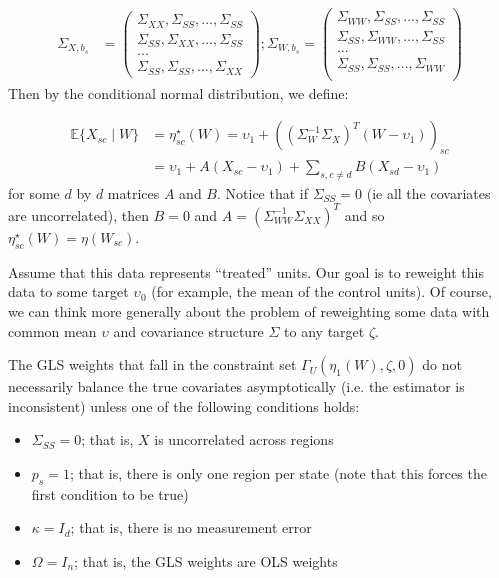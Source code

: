 \begin{align*}
\Sigma_{X, b_s} &= \begin{pmatrix}
\Sigma_{XX}, \Sigma_{SS}, ..., \Sigma_{SS} \\
\Sigma_{SS}, \Sigma_{XX}, ..., \Sigma_{SS} \\
... \\
\Sigma_{SS}, \Sigma_{SS}, ..., \Sigma_{XX}
\end{pmatrix};
\Sigma_{W, b_s} = \begin{pmatrix}
\Sigma_{WW}, \Sigma_{SS}, ..., \Sigma_{SS} \\
\Sigma_{SS}, \Sigma_{WW}, ..., \Sigma_{SS} \\
... \\
\Sigma_{SS}, \Sigma_{SS}, ..., \Sigma_{WW} \\
\end{pmatrix}
\end{align*}
%
Then by the conditional normal distribution, we define:

\begin{align*}
    \mathbb{E}\{X_{sc} \mid W\} &= \eta_{sc}^\star(W) = \upsilon_1 + ((\Sigma_W^{-1}\Sigma_X)^T(W - \upsilon_1))_{sc} \\
    &= \upsilon_1 + A(X_{sc} - \upsilon_1) + \sum_{s, c\ne d}B(X_{sd} - \upsilon_1)
\end{align*}
%
for some $d$ by $d$ matrices $A$ and $B$. Notice that if $\Sigma_{SS} = 0$ (ie all the covariates are uncorrelated), then $B = 0$ and $A = (\Sigma_{WW}^{-1}\Sigma_{XX})^T$ and so $\eta^\star_{sc}(W) = \eta(W_{sc})$.

Assume that this data represents ``treated'' units. Our goal is to reweight this data to some target $\upsilon_0$ (for example, the mean of the control units). Of course, we can think more generally about the problem of reweighting some data with common mean $\upsilon$ and covariance structure $\Sigma$ to any target $\zeta$.

\begin{proposition}
    The GLS weights that fall in the constraint set $\Gamma_U(\eta_1(W), \zeta, 0)$ do not necessarily balance the true covariates asymptotically (i.e. the estimator is inconsistent) unless one of the following conditions holds:
    \begin{itemize}
    \item $\Sigma_{SS} = 0$; that is, $X$ is uncorrelated across regions
    \item $p_s = 1$; that is, there is only one region per state (note that this forces the first condition to be true)
    \item $\kappa = I_d$; that is, there is no measurement error
    \item $\Omega = I_n$; that is, the GLS weights are OLS weights
    \end{itemize}
\end{proposition}

